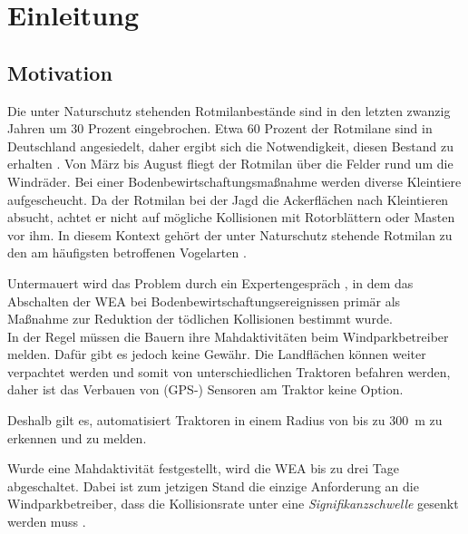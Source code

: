 \chapter{Einleitung}
\label{ch:intro}


\section{Motivation}
\label{ch1:motivation}
Die unter Naturschutz stehenden Rotmilanbestände sind in den letzten zwanzig Jahren um 30 Prozent eingebrochen.
Etwa 60 Prozent der Rotmilane sind in Deutschland angesiedelt, daher ergibt sich die Notwendigkeit, diesen Bestand zu erhalten \cite{landesbund_fur_vogelschutz_in_bayern_rotmilan_nodate}.
Von März bis August fliegt der Rotmilan über die Felder rund um die Windräder.
Bei einer Bodenbewirtschaftungsmaßnahme werden diverse Kleintiere aufgescheucht.
Da der Rotmilan bei der Jagd die Ackerflächen nach Kleintieren absucht, achtet er nicht auf mögliche Kollisionen mit Rotorblättern oder Masten vor ihm.
In diesem Kontext gehört der unter Naturschutz stehende Rotmilan zu den am häufigsten betroffenen Vogelarten \cite{grunkorn_ermittlung_2016}.

\bigskip
Untermauert wird das Problem durch ein Expertengespräch \cite{blew_wirksamkeit_2018}, in dem das Abschalten der \ac{WEA} bei Bodenbewirtschaftungsereignissen primär als Maßnahme zur Reduktion der tödlichen Kollisionen bestimmt wurde. \\
In der Regel müssen die Bauern ihre Mahdaktivitäten beim Windparkbetreiber melden.
Dafür gibt es jedoch keine Gewähr.
Die Landflächen können weiter verpachtet werden und somit von unterschiedlichen Traktoren befahren werden, daher ist das Verbauen von (GPS-) Sensoren am Traktor keine Option.

Deshalb gilt es, automatisiert Traktoren in einem Radius von bis zu \SI{300}{\metre} zu erkennen und zu melden.

Wurde eine Mahdaktivität festgestellt, wird die \ac{WEA} bis zu drei Tage abgeschaltet.
Dabei ist zum jetzigen Stand die einzige Anforderung an die Windparkbetreiber, dass die Kollisionsrate unter eine \textit{Signifikanzschwelle} gesenkt werden muss \cite{schuster_anforderungen_2019} \cite[\S~44]{noauthor_bnatschg_2009}.

